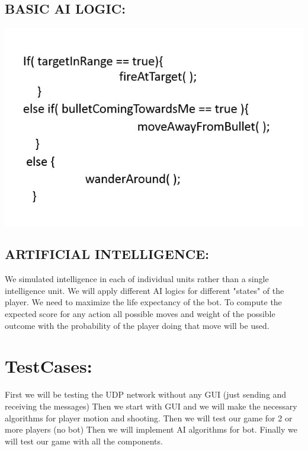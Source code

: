 \documentclass[10pt]{article}
\begin{document}
\subsection*{BASIC AI LOGIC:}
\includegraphics[width=\textwidth]{AI.jpg}
\\
\subsection{ARTIFICIAL INTELLIGENCE:}
We simulated intelligence in each of individual units rather than a single intelligence unit. We will apply different AI logics for different "states" of the player. We need to maximize the life expectancy of the bot. To compute the expected score for any action all possible moves and weight of the possible outcome with the probability of the player doing that move will be used. 
\\
\section{TestCases:}
First we will be testing the UDP network without any GUI (just sending and receiving the messages)
Then we start with GUI and we will make the necessary algorithms for player motion and shooting.
Then we will test our game for 2 or more players (no bot) 
Then we will implement AI algorithms for bot.
 Finally we will test our game with all the components.
\\
\end{document}
